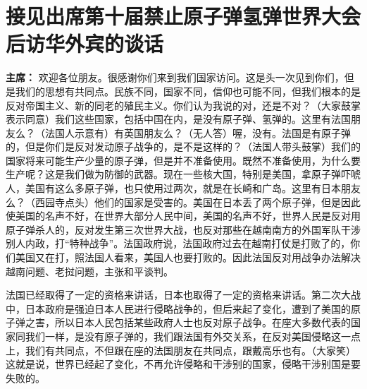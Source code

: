 \section[接见出席第十届禁止原子弹氢弹世界大会后访华外宾的谈话（一九六四年八月二十二日）]{接见出席第十届禁止原子弹氢弹世界大会后访华外宾的谈话}


\begin{list}{}{
    \setlength{\topsep}{0pt}        %
    \setlength{\partopsep}{0pt}     %
    \setlength{\parsep}{\parskip}   %
    \setlength{\itemsep}{\lineskip}       %
    \setlength{\labelsep}{0pt}%
    \setlength{\labelwidth}{3em}%
    \setlength{\itemindent}{0pt}%
    \setlength\listparindent{\parindent}
    \setlength{\leftmargin}{3em}
    \setlength{\rightmargin}{0pt}
    }
\item[\textbf{主席：}] 欢迎各位朋友。很感谢你们来到我们国家访问。这是头一次见到你们，但是我们的思想有共同点。民族不同，国家不同，信仰也可能不同，但我们根本的是反对帝国主义、新的同老的殖民主义。你们认为我说的对，还是不对？（大家鼓掌表示同意）我们这些国家，包括中国在内，是没有原子弹、氢弹的。这里有法国朋友么？（法国人示意有）有英国朋友么？（无人答）喔，没有。法国是有原子弹的，但是你们是反对发动原子战争的，是不是这样的？（法国人带头鼓掌）我们的国家将来可能生产少量的原子弹，但是并不准备使用。既然不准备使用，为什么要生产呢？这是我们做为防御的武器。现在一些核大国，特别是美国，拿原子弹吓唬人，美国有这么多原子弹，也只使用过两次，就是在长崎和广岛。这里有日本朋友么？（西园寺点头）他们的国家是受害的。美国在日本丢了两个原子弹，但是因此使美国的名声不好，在世界大部分人民中间，美国的名声不好，世界人民是反对用原子弹杀人的，反对发生第三次世界大战，也反对那些在越南南方的外国军队干涉别人内政，打“特种战争”。法国政府说，法国政府过去在越南打仗是打败了的，你们美国又在打，照法国人看来，美国人也要打败的。因此法国反对用战争办法解决越南问题、老挝问题，主张和平谈判。

法国已经取得了一定的资格来讲话，日本也取得了一定的资格来讲话。第二次大战中，日本政府是强迫日本人民进行侵略战争的，但后来起了变化，遭到了美国的原子弹之害，所以日本人民包括某些政府人士也反对原子战争。在座大多数代表的国家同我们一样，是没有原子弹的，我们跟法国有外交关系，在反对美国侵略这一点上，我们有共同点，不但跟在座的法国朋友在共同点，跟戴高乐也有。（大家笑）这就是说，世界已经起了变化，不再允许侵略和干涉别的国家，侵略干涉别国是要失败的。


\end{list}
